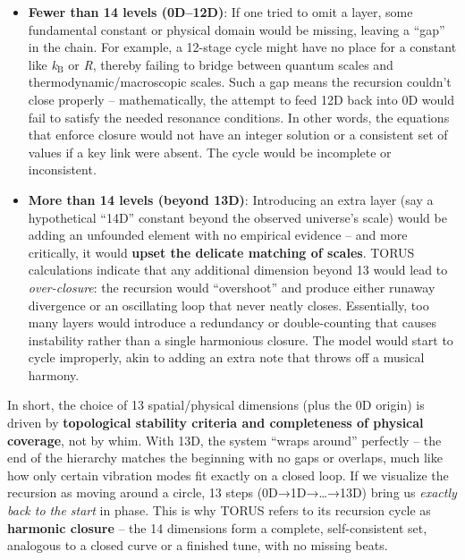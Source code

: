 \documentclass[]{article}
\newcommand{\subscript}[1]{\ensuremath{_{\mathrm{#1}}}}
\begin{document}
\begin{itemize}
\item
  \textbf{Fewer than 14 levels (0D--12D)}: If one tried to omit a layer,
  some fundamental constant or physical domain would be missing, leaving
  a ``gap'' in the chain. For example, a 12-stage cycle might have no
  place for a constant like
  \emph{k\subscript{B}} or
  \emph{R}, thereby failing to bridge between quantum scales and
  thermodynamic/macroscopic scales​. Such a gap means the recursion
  couldn't close properly -- mathematically, the attempt to feed 12D
  back into 0D would fail to satisfy the needed resonance conditions. In
  other words, the equations that enforce closure would not have an
  integer solution or a consistent set of values if a key link were
  absent​. The cycle would be incomplete or inconsistent.
\item
  \textbf{More than 14 levels (beyond 13D)}: Introducing an extra layer
  (say a hypothetical ``14D'' constant beyond the observed universe's
  scale) would be adding an unfounded element with no empirical evidence
  -- and more critically, it would \textbf{upset the delicate matching
  of scales}. TORUS calculations indicate that any additional dimension
  beyond 13 would lead to \emph{over-closure}: the recursion would
  ``overshoot'' and produce either runaway divergence or an oscillating
  loop that never neatly closes​. Essentially, too many layers would
  introduce a redundancy or double-counting that causes instability
  rather than a single harmonious closure. The model would start to
  cycle improperly, akin to adding an extra note that throws off a
  musical harmony.
\end{itemize}

In short, the choice of 13 spatial/physical dimensions (plus the 0D
origin) is driven by \textbf{topological stability criteria and
completeness of physical coverage}, not by whim​. With 13D, the system
``wraps around'' perfectly -- the end of the hierarchy matches the
beginning with no gaps or overlaps, much like how only certain vibration
modes fit exactly on a closed loop​. If we visualize the recursion as
moving around a circle, 13 steps (0D→1D→\ldots{}→13D) bring us
\emph{exactly back to the start} in phase. This is why TORUS refers to
its recursion cycle as \textbf{harmonic closure} -- the 14 dimensions
form a complete, self-consistent set, analogous to a closed curve or a
finished tune, with no missing beats.
\end{document}
